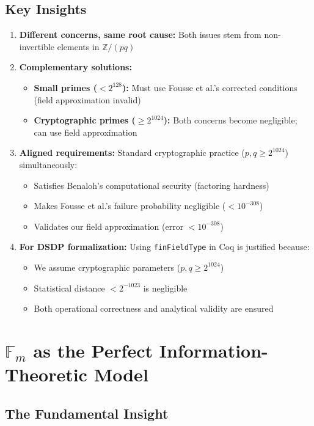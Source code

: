 \documentclass[11pt]{article}
\theoremstyle{definition}
\begin{document}
\subsection{Key Insights}

\begin{enumerate}
\item \textbf{Different concerns, same root cause:} Both issues stem from non-invertible elements in $\mathbb{Z}/(pq)$

\item \textbf{Complementary solutions:}
\begin{itemize}
\item \textbf{Small primes ($< 2^{128}$):} Must use Fousse et al.'s corrected conditions (field approximation invalid)
\item \textbf{Cryptographic primes ($\geq 2^{1024}$):} Both concerns become negligible; can use field approximation
\end{itemize}

\item \textbf{Aligned requirements:} Standard cryptographic practice ($p, q \geq 2^{1024}$) simultaneously:
\begin{itemize}
\item Satisfies Benaloh's computational security (factoring hardness)
\item Makes Fousse et al.'s failure probability negligible ($< 10^{-308}$)
\item Validates our field approximation (error $< 10^{-308}$)
\end{itemize}

\item \textbf{For DSDP formalization:} Using \texttt{finFieldType} in Coq is justified because:
\begin{itemize}
\item We assume cryptographic parameters ($p, q \geq 2^{1024}$)
\item Statistical distance $< 2^{-1023}$ is negligible
\item Both operational correctness and analytical validity are ensured
\end{itemize}
\end{enumerate}

\section{$\mathbb{F}_m$ as the Perfect Information-Theoretic Model}

\subsection{The Fundamental Insight}
\end{document}
